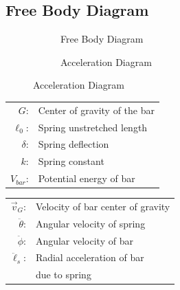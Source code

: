 \documentclass[12pt]{report}
\begin{document}
\begin{flushleft}
\section{Free Body Diagram}
\begin{figure}[!htp]
  \caption{Acceleration and Free Body Diagrams}
   \begin{minipage}[c]{.5\textwidth}
     \begin{subfigure}{\textwidth}
       \caption{Free Body Diagram}
       \center
      
      \end{subfigure}
   \end{minipage}%
   \begin{minipage}[c]{.5\textwidth}
     \begin{subfigure}{\textwidth}
       \caption{Acceleration Diagram}
       \center
       
    \end{subfigure}
   \end{minipage}
\end{figure}
\begin{minipage}[c]{.5\textwidth}
  \center
  \begin{tabular}{rl}
  $G$:&Center of gravity of the bar\\
  $\ell_0$:& Spring unstretched length \\
  $\delta$:& Spring deflection \\
  $k$:& Spring constant \\
  $V_{bar}$:& Potential energy of bar \\
\end{tabular}
\end{minipage}%
\begin{minipage}[c]{.5\textwidth}
 \center
 \begin{tabular}{rl}
 $\vec{v}_G$:& Velocity of bar center of gravity\\
 $\ddot{\theta}$:& Angular velocity of spring \\
 $\ddot{\phi}$:& Angular velocity of bar\\
 $\ddot{\ell}_s$:& Radial acceleration of bar\\ & due to spring
\end{tabular}
\end{minipage}


\end{flushleft}
\end{document}
